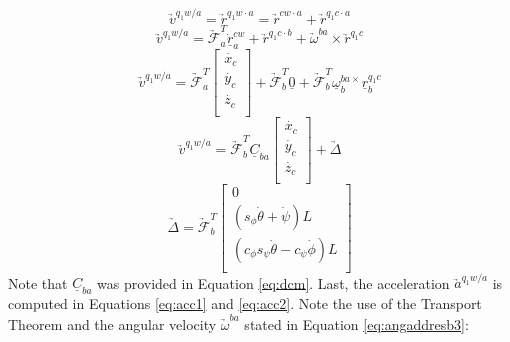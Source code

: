\documentclass[journal]{IEEEtran}
\begin{document}
\begin{equation}
	\underrightarrow{v}^{q_1w/a}=\underrightarrow{r}^{q_1w\cdot{a}}=\underrightarrow{r}^{cw\cdot{a}}+\underrightarrow{r}^{q_1c\cdot{a}}
	\label{eq:vel1}
\end{equation}
\begin{equation}
	\underrightarrow{v}^{q_1w/a}=\underrightarrow{\mathcal{F}}^T_a\underline{\dot{r}}^{cw}_a+\underrightarrow{r}^{q_1c\cdot{b}}+	\underrightarrow{\omega}^{ba}\times\underrightarrow{r}^{q_1c}
	\label{eq:vel2}
\end{equation}
\begin{equation}
	\underrightarrow{v}^{q_1w/a}=\underrightarrow{\mathcal{F}}^T_a\left[ \begin{array}{c}
			\dot{x_c} \\
			\dot{y_c} \\
			\dot{z_c} \\
			\end{array} \right]+\underrightarrow{\mathcal{F}}^T_b\underline{0}+\underrightarrow{\mathcal{F}}^T_b\underline{\omega}^{ba\times}_b\underline{r}^{q_1c}_b
	\label{eq:vel3}
\end{equation}
\begin{equation}
	\underrightarrow{v}^{q_1w/a}=\underrightarrow{\mathcal{F}}^T_b\underline{C}_{ba}\left[ \begin{array}{c}
			\dot{x_c} \\
			\dot{y_c} \\
			\dot{z_c} \\
			\end{array} \right]+\underrightarrow{\Delta}		
	\label{eq:vel4}
\end{equation}
\begin{equation}
	\underrightarrow{\Delta}=\underrightarrow{\mathcal{F}}^T_b\left[    \begin{array}{c}
						0 \\
			(s_{\phi}\dot{\theta}+\dot{\psi})L \\
			(c_{\phi}s_{\psi}\dot{\theta}-c_{\psi}\dot{\phi})L \\
						\end{array} \right]		
	\label{eq:vel5}
\end{equation}
Note that $\underline{C}_{ba}$ was provided in Equation \ref{eq:dcm}. Last, the acceleration $\underrightarrow{a}^{q_1w/a}$ is computed in Equations \ref{eq:acc1} and \ref{eq:acc2}. Note the use of the Transport Theorem and the angular velocity $\underrightarrow{\omega}^{ba}$ stated in Equation \ref{eq:angaddresb3}:
\end{document}
